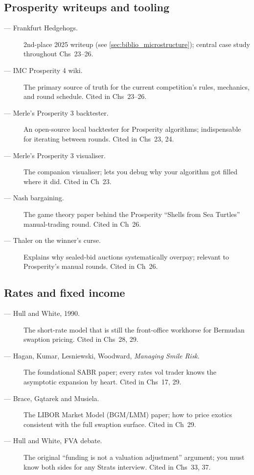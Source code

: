 \subsection{Prosperity writeups and tooling}

\begin{description}
  \item[\citet{frankfurthedgehogs2025} --- Frankfurt Hedgehogs.]
    2nd-place 2025 writeup (see \cref{sec:biblio_microstructure});
    central case study throughout Chs~23--26.
  \item[\citet{prosperity4wiki} --- IMC Prosperity 4 wiki.] The
    primary source of truth for the current competition's rules,
    mechanics, and round schedule. Cited in Chs~23--26.
  \item[\citet{jmerle_backtester} --- Merle's Prosperity 3
    backtester.] An open-source local backtester for Prosperity
    algorithms; indispensable for iterating between rounds. Cited
    in Chs~23, 24.
  \item[\citet{jmerle_visualiser} --- Merle's Prosperity 3
    visualiser.] The companion visualiser; lets you debug why your
    algorithm got filled where it did. Cited in Ch~23.
  \item[\citet{nash1950bargaining} --- Nash bargaining.] The game
    theory paper behind the Prosperity ``Shells from Sea Turtles''
    manual-trading round. Cited in Ch~26.
  \item[\citet{thaler1988anomalies} --- Thaler on the winner's curse.]
    Explains why sealed-bid auctions systematically overpay; relevant
    to Prosperity's manual rounds. Cited in Ch~26.
\end{description}

\subsection{Rates and fixed income}

\begin{description}
  \item[\citet{hullwhite1990} --- Hull and White, 1990.] The
    short-rate model that is still the front-office workhorse for
    Bermudan swaption pricing. Cited in Chs~28, 29.
  \item[\citet{hagan2002managing} --- Hagan, Kumar, Lesniewski,
    Woodward, \emph{Managing Smile Risk}.] The foundational SABR
    paper; every rates vol trader knows the asymptotic expansion by
    heart. Cited in Chs~17, 29.
  \item[\citet{braceetal1997} --- Brace, G\k{a}tarek and Musiela.]
    The LIBOR Market Model (BGM/LMM) paper; how to price exotics
    consistent with the full swaption surface. Cited in Ch~29.
  \item[\citet{hullwhite2012fva} --- Hull and White, FVA debate.]
    The original ``funding is not a valuation adjustment'' argument;
    you must know both sides for any Strats interview. Cited in
    Chs~33, 37.
\end{description}

